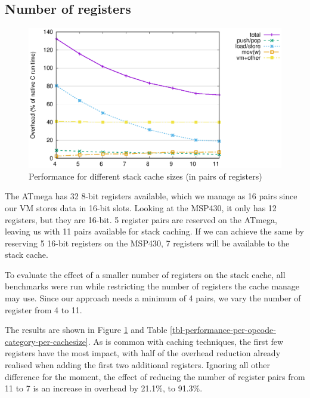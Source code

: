 \subsection{Number of registers}

\begin{figure}
\centering
\includegraphics[width=\mygraphsize]{cachesize-performance-per-opcode-category.eps}
\caption{Performance for different stack cache sizes (in pairs of registers)}
\label{fig-performance-per-opcode-category-per-cachesize}
\end{figure}



The ATmega has 32 8-bit registers available, which we manage as 16 pairs since our VM stores data in 16-bit slots. Looking at the MSP430, it only has 12 registers, but they are 16-bit. 5 register pairs are reserved on the ATmega, leaving us with 11 pairs available for stack caching. If we can achieve the same by reserving 5 16-bit registers on the MSP430, 7 registers will be available to the stack cache.

To evaluate the effect of a smaller number of registers on the stack cache, all benchmarks were run while restricting the number of registers the cache manage may use. Since our approach needs a minimum of 4 pairs, we vary the number of register from 4 to 11.

The results are shown in Figure \ref{fig-performance-per-opcode-category-per-cachesize} and Table \ref{tbl-performance-per-opcode-category-per-cachesize}. As is common with caching techniques, the first few registers have the most impact, with half of the overhead reduction already realised when adding the first two additional registers. Ignoring all other difference for the moment, the effect of reducing the number of register pairs from 11 to 7 is an increase in overhead by 21.1\%, to 91.3\%.

